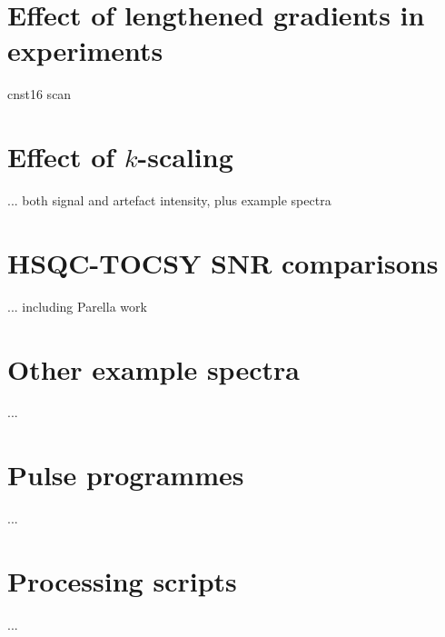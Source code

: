 \section{Effect of lengthened gradients in \texorpdfstring{\nitrogen{}}{15N} experiments}

cnst16 scan

\section{Effect of \texorpdfstring{$k$}{k}-scaling}

... both signal and artefact intensity, plus example spectra

\section{HSQC-TOCSY SNR comparisons}

... including Parella work

\section{Other example spectra}

...

\section{Pulse programmes}

...

\section{Processing scripts}

...
